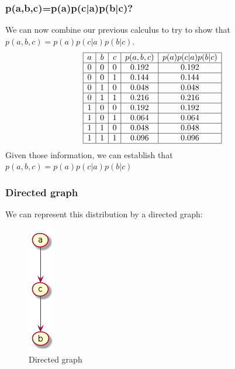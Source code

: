 \documentclass{article}
\begin{document}
            \subsubsection{p(a,b,c)=p(a)p(c|a)p(b|c)?}
                We can now combine our previous calculus to try to show that $p(a,b,c)=p(a)p(c|a)p(b|c)$.
                \[
                    \begin{array}{|c|c|c|c|c|}
                        \hline
                        a & b & c & p(a, b, c) & p(a)p(c|a)p(b|c) \\
                        \hline
                        0 & 0 & 0 & 0.192 & 0.192 \\
                        \hline
                        0 & 0 & 1 & 0.144 & 0.144 \\
                        \hline
                        0 & 1 & 0 & 0.048 & 0.048 \\
                        \hline
                        0 & 1 & 1 & 0.216 & 0.216 \\
                        \hline
                        1 & 0 & 0 & 0.192 & 0.192 \\
                        \hline
                        1 & 0 & 1 & 0.064 & 0.064 \\
                        \hline
                        1 & 1 & 0 & 0.048 & 0.048 \\
                        \hline
                        1 & 1 & 1 & 0.096 & 0.096 \\
                        \hline
                    \end{array}
                \]
                Given those information, we can establish that $p(a,b,c)=p(a)p(c|a)p(b|c)$
            \subsubsection{Directed graph}
                We can represent this distribution by a directed graph:
                \begin{figure}[H]
                    \centering
                    \includegraphics[scale=0.5]{problem1/graph.png}
                    \caption{Directed graph}
                \end{figure}
    \newpage
\end{document}

